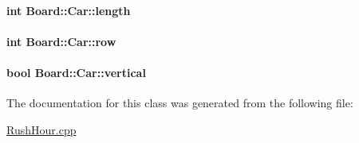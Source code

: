 \paragraph[{\texorpdfstring{length}{length}}]{\setlength{\rightskip}{0pt plus 5cm}int Board\+::\+Car\+::length}\hypertarget{class_board_1_1_car_a64a2c8d3024790015f07d48fe066ce55}{}\label{class_board_1_1_car_a64a2c8d3024790015f07d48fe066ce55}
\paragraph[{\texorpdfstring{row}{row}}]{\setlength{\rightskip}{0pt plus 5cm}int Board\+::\+Car\+::row}\hypertarget{class_board_1_1_car_a7bb2575a11bc3119c4d036d469d79454}{}\label{class_board_1_1_car_a7bb2575a11bc3119c4d036d469d79454}
\paragraph[{\texorpdfstring{vertical}{vertical}}]{\setlength{\rightskip}{0pt plus 5cm}bool Board\+::\+Car\+::vertical}\hypertarget{class_board_1_1_car_ac9e9100e7f43bcedee740d5840aefb6f}{}\label{class_board_1_1_car_ac9e9100e7f43bcedee740d5840aefb6f}


The documentation for this class was generated from the following file\+:\begin{DoxyCompactItemize}
\item 
\hyperlink{_rush_hour_8cpp}{Rush\+Hour.\+cpp}\end{DoxyCompactItemize}
